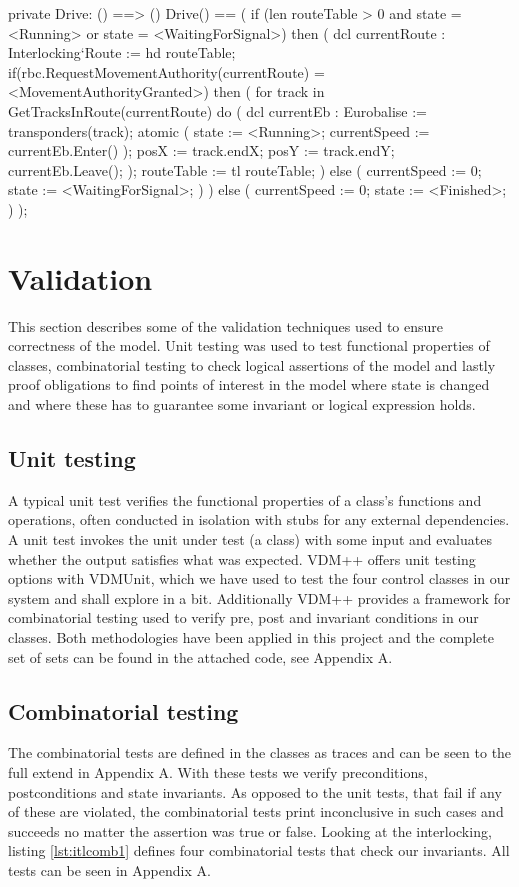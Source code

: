 \documentclass[preprint,12pt]{elsarticle}
\begin{document}
\begin{vdmsl}[label=lst:train1,caption={Drive() moves the train along a sequence of routes, requests MA for each route and obeys track speed limits.}]
	private Drive: () ==> ()
	Drive() ==
	(
	if (len routeTable > 0
		and state = <Running> or state = <WaitingForSignal>) then (
		dcl currentRoute : Interlocking`Route := hd routeTable;
		if(rbc.RequestMovementAuthority(currentRoute)
		 = <MovementAuthorityGranted>)
		then (
			for track in GetTracksInRoute(currentRoute) do (
				dcl currentEb : Eurobalise := transponders(track);
				atomic (
					state := <Running>;
					currentSpeed := currentEb.Enter()
				);
				posX := track.endX;
				posY := track.endY;
				currentEb.Leave();
				);
			routeTable := tl routeTable;
		) else (
			currentSpeed := 0;
			state := <WaitingForSignal>;
			)
		) else (
			currentSpeed := 0;
			state := <Finished>;
		)
	);
\end{vdmsl}

\section{Validation}

This section describes some of the validation techniques used to ensure correctness of the model. Unit testing was used to test functional properties of classes, combinatorial testing to check logical assertions of the model and lastly proof obligations to find points of interest in the model where state is changed and where these has to guarantee some invariant or logical expression holds.

\subsection{Unit testing}
A typical unit test verifies the functional properties of a class's functions and operations, often conducted in isolation with stubs for any external dependencies. A unit test invokes the unit under test (a class) with some input and evaluates whether the output satisfies what was expected. VDM++ offers unit testing options with VDMUnit, which we have used to test the four control classes in our system and shall explore in a bit. Additionally VDM++ provides a framework for combinatorial testing used to verify pre, post and invariant conditions in our classes. Both methodologies have been applied in this project and the complete set of sets can be found in the attached code, see Appendix A.

\subsection{Combinatorial testing}
The combinatorial tests are defined in the classes as traces and can be seen to the full extend in Appendix A. With these tests we verify preconditions, postconditions and state invariants. As opposed to the unit tests, that fail if any of these are violated, the combinatorial tests print inconclusive in such cases and succeeds no matter the assertion was true or false. Looking at the interlocking, listing \ref{lst:itlcomb1} defines four combinatorial tests that check our invariants. All tests can be seen in Appendix A.
\end{document}
